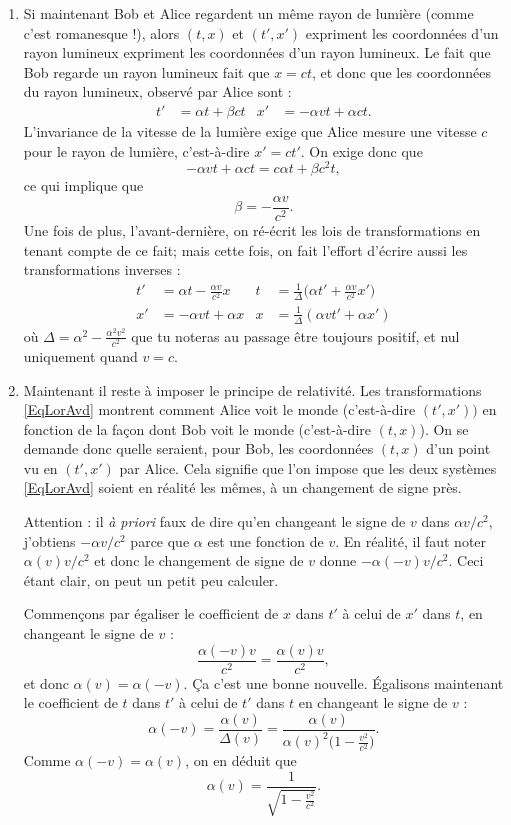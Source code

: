 \begin{enumerate}
\item Si maintenant Bob et Alice regardent un même rayon de lumière (comme c'est romanesque !), alors $(t,x)$ et $(t',x')$ expriment les coordonnées d'un rayon lumineux expriment les coordonnées d'un rayon lumineux. Le fait que Bob regarde un rayon lumineux fait que $x=ct$, et donc que les coordonnées du rayon lumineux, observé par Alice sont :
\begin{align}
   t'&=\alpha t+\beta ct	&x'&=-\alpha v t+\alpha c t.
\end{align}
L'invariance de la vitesse de la lumière exige que Alice mesure une vitesse $c$ pour le rayon de lumière, c'est-à-dire $x'=ct'$. On exige donc que
\[
  -\alpha v t+\alpha ct=c\alpha t+\beta c^2t,
\]
ce qui implique que
\[
  \beta=-\frac{ \alpha v }{ c^2 }.
\]
Une fois de plus, l'avant-dernière,  on ré-écrit les lois de transformations en tenant compte de ce fait; mais cette fois, on fait l'effort d'écrire aussi les transformations inverses :
\begin{align}	\label{EqLorAvd}
t'&=\alpha t-\frac{ \alpha v }{ c^2 }x		& t&=\frac{1}{ \Delta }\big( \alpha t'+\frac{ \alpha v }{ c^2 }x' \big)\\
x'&=-\alpha vt+\alpha x				& x&=\frac{1}{ \Delta }(\alpha v t'+\alpha x')
\end{align}
où $\Delta=\alpha^2-\frac{ \alpha^2 v^2 }{ c^2 }$ que tu noteras au passage être toujours positif, et nul uniquement quand $v=c$.

\item Maintenant il reste à imposer le principe de relativité. Les transformations \eqref{EqLorAvd} montrent comment Alice voit le monde (c'est-à-dire $(t',x'))$ en fonction de la façon dont Bob voit le monde (c'est-à-dire $(t,x)$). On se demande donc quelle seraient, pour Bob, les coordonnées $(t,x)$ d'un point vu en $(t',x')$ par Alice. Cela signifie que l'on impose que les deux systèmes \eqref{EqLorAvd} soient en réalité les mêmes, à un changement de signe près.

Attention : il \emph{à priori} faux de dire qu'en changeant le signe de $v$ dans $\alpha v/c^2$, j'obtiens $-\alpha v/c^2$ parce que $\alpha$ est une fonction de $v$. En réalité, il faut noter $\alpha(v)v/c^2$ et donc le changement de signe de $v$ donne $-\alpha(-v)v/c^2$. Ceci étant clair, on peut un petit peu calculer.

Commençons par égaliser le coefficient de $x$ dans $t'$ à celui de $x'$ dans $t$, en changeant le signe de $v$ :
\[
  \frac{ \alpha(-v)v }{ c^2 }=\frac{ \alpha(v)v }{ c^2 },
\]
 et donc $\alpha(v)=\alpha(-v)$. Ça c'est une bonne nouvelle. Égalisons maintenant le coefficient de $t$ dans $t'$ à celui de $t'$ dans $t$ en changeant le signe de $v$ :
\[
  \alpha(-v)=\frac{ \alpha(v) }{ \Delta(v) }=\frac{ \alpha(v) }{ \alpha(v)^2\big( 1-\frac{ v^2 }{ c^2 } \big) }.
\]
Comme $\alpha(-v)=\alpha(v)$, on en déduit que
\begin{equation}		\label{EqalphaLo}
\alpha(v)=\frac{1}{ \sqrt{1-\frac{ v^2 }{ c^2 }} }.
\end{equation}
\end{enumerate}

